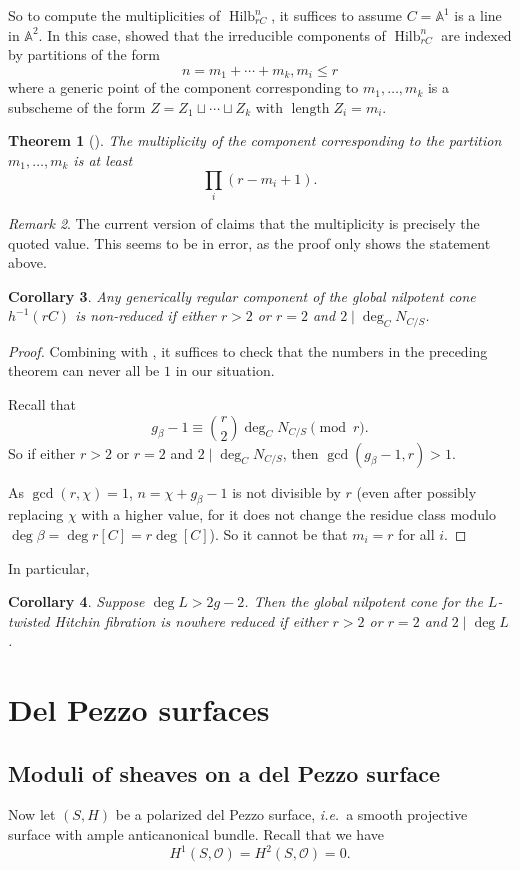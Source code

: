 \documentclass{amsart}
\theoremstyle{plain}
\newtheorem{theorem}{Theorem}[section]
\newtheorem{corollary}[theorem]{Corollary}
\theoremstyle{definition}
\theoremstyle{remark}
\newtheorem{remark}[theorem]{Remark}
\begin{document}
So to compute the multiplicities of $\operatorname{Hilb}_{rC}^n$, it suffices to assume $C=\mathbb A^1$ is a line in $\mathbb A^2$.
In this case, \cite{luan} showed that the irreducible components of $\operatorname{Hilb}_{rC}^n$ are indexed by partitions of the form
\[n=m_1+\cdots+m_k,m_i\le r\]
where a generic point of the component corresponding to $m_1,\ldots,m_k$ is a subscheme of the form $Z=Z_1\sqcup\cdots\sqcup Z_k$ with $\operatorname{length}Z_i=m_i$.
\begin{theorem}[\cite{luan}]
    The multiplicity of the component corresponding to the partition $m_1,\ldots,m_k$ is at least
    \[
    \prod_i(r-m_i+1).
    \]
\end{theorem}
\begin{remark}
    The current version of \cite{luan} claims that the multiplicity is precisely the quoted value.
    This seems to be in error, as the proof only shows the statement above.
\end{remark}
\begin{corollary}\label{greg_nonred}
    Any generically regular component of the global nilpotent cone $h^{-1}(rC)$ is non-reduced if either $r>2$ or $r=2$ and $2\mid\deg_CN_{C/S}$.
\end{corollary}
\begin{proof}
    Combining  with , it suffices to check that the numbers in the preceding theorem can never all be $1$ in our situation.

    Recall that
    \[g_\beta-1\equiv \binom{r}{2}\deg_CN_{C/S}\pmod{r}.\]
    So if either $r>2$ or $r=2$ and $2\mid\deg_CN_{C/S}$, then $\gcd(g_\beta-1,r)>1$.

    As $\gcd(r,\chi)=1$, $n=\chi+g_\beta-1$ is not divisible by $r$ (even after possibly replacing $\chi$ with a higher value, for it does not change the residue class modulo $\deg\beta=\deg r[C]=r\deg [C]$).
    So it cannot be that $m_i=r$ for all $i$.
\end{proof}
In particular,
\begin{corollary}
    Suppose $\deg L>2g-2$.
    Then the global nilpotent cone for the $L$-twisted Hitchin fibration is nowhere reduced if either $r>2$ or $r=2$ and $2\mid \deg L$.
\end{corollary}

\section{Del Pezzo surfaces}
\subsection{Moduli of sheaves on a del Pezzo surface}
Now let $(S,H)$ be a polarized del Pezzo surface, \emph{i.e.}~a smooth projective surface with ample anticanonical bundle.
Recall that we have
\[H^1(S,\mathcal O)=H^2(S,\mathcal O)=0.\]
\end{document}
